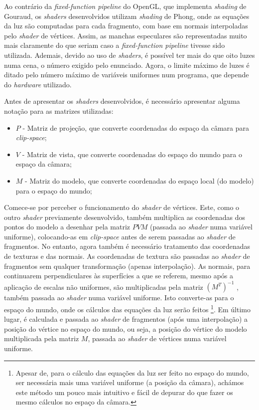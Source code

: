 \documentclass[12pt, a4paper]{article}
\begin{document}
Ao contrário da \emph{fixed-function pipeline} do OpenGL, que implementa \emph{shading} de Gouraud,
os \emph{shaders} desenvolvidos utilizam \emph{shading} de Phong, onde as equações da luz são
computadas para cada fragmento, com base em normais interpoladas pelo \emph{shader} de vértices.
Assim, as manchas especulares são representadas muito mais claramente do que seriam caso a
\emph{fixed-function pipeline} tivesse sido utilizada. Ademais, devido ao uso de \emph{shaders}, é
possível ter mais do que oito luzes numa cena, o número exigido pelo enunciado. Agora, o limite
máximo de luzes é ditado pelo número máximo de variáveis uniformes num programa, que depende do
\emph{hardware} utilizado.

Antes de apresentar os \emph{shaders} desenvolvidos, é necessário apresentar alguma notação para as
matrizes utilizadas:

\begin{itemize}
    \item $P$ - Matriz de projeção, que converte coordenadas do espaço da câmara para
        \emph{clip-space};
    \item $V$ - Matriz de vista, que converte coordenadas do espaço do mundo para o espaço da
        câmara;
    \item $M$ - Matriz do modelo, que converte coordenadas do espaço local (do modelo) para o espaço
        do mundo;
\end{itemize}

Comece-se por perceber o funcionamento do \emph{shader} de vértices. Este, como o outro
\emph{shader} previamente desenvolvido, também multiplica as coordenadas dos pontos do modelo a
desenhar pela matriz $PVM$ (passada ao \emph{shader} numa variável uniforme), colocando-as em
\emph{clip-space} antes de serem passadas ao \emph{shader} de fragmentos. No entanto, agora também é
necessário tratamento das coordenadas de texturas e das normais. As coordenadas de textura são
passadas ao \emph{shader} de fragmentos sem qualquer transformação (apenas interpolação). As
normais, para continuarem perpendiculares às superfícies a que se referem, mesmo após a aplicação de
escalas não uniformes, são multiplicadas pela matriz $(M^T)^{-1}$ \cite{learn-opengl-1}, também
passada ao \emph{shader} numa variável uniforme. Isto converte-as para o espaço do mundo, onde os
cálculos das equações da luz serão feitos
\footnote{Apesar de, para o cálculo das equações da
luz ser feito no espaço do mundo, ser necessária mais uma variável uniforme (a posição da câmara),
achámos este método um pouco mais intuitivo e fácil de depurar do que fazer os mesmo cálculos no
espaço da câmara.}.
Em último lugar, é calculada e passada ao \emph{shader} de fragmentos (após uma interpolação) a
posição do vértice no espaço do mundo, ou seja, a posição do vértice do modelo multiplicada pela
matriz $M$, passada ao \emph{shader} de vértices numa variável uniforme.
\end{document}
